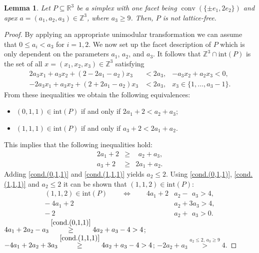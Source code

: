 \documentclass[a4paper]{article}
\theoremstyle{plain}
\newtheorem{lemma}[nn]{Lemma}
\begin{document}
\begin{lemma} \label{simpl.sail}
Let $P \subseteq {\mathbb{R}}^3$ be a simplex with one facet being
${{\mathop{\mathrm{{conv}}}}}(\{\pm e_1, 2e_2\})$ and apex $a = (a_1, a_2, a_3) \in
{\mathbb{Z}}^3$, where $a_3 \geq 9$. Then, $P$ is not lattice-free.
\end{lemma}

\begin{proof}
By applying an appropriate unimodular transformation we can
assume that $0 \leq a_i < a_3$ for $i = 1,2$.
We now set up the facet description of $P$ which is only
dependent on the parameters $a_1$, $a_2$, and $a_3$.
It follows that ${\mathbb{Z}}^3 \cap {\mathrm{int}}(P)$ is the set of all
$x = (x_1, x_2, x_3) \in {\mathbb{Z}}^3$ satisfying
\begin{align*}
   2a_3 x_1 + a_3 x_2 + (2 - 2a_1 - a_2) x_3 & < 2a_3, &
            - a_3 x_2 +              a_2 x_3 < 0, \\
  -2a_3 x_1 + a_3 x_2 + (2 + 2a_1 - a_2) x_3 & < 2a_3, &
  x_3 \in \{1, \ldots, a_3 - 1\}.
\end{align*}
From these inequalities we obtain the following
equivalences:
\begin{itemize} 
  \item $(0,1,1) \in {\mathrm{int}}(P)$ if and only if $2a_1 + 2 < a_2 + a_3$;  
  \item $(1,1,1) \in {\mathrm{int}}(P)$ if and only if $a_3 + 2 < 2a_1 + a_2$. 
\end{itemize}
This implies that the following inequalities hold:
\begin{eqnarray}
  2a_1 + 2 & \geq & \ \, a_2 + a_3, \label{cond.(0,1,1)} \\
   a_3 + 2 & \geq & 2a_1 + a_2. \label{cond.(1,1,1)}
\end{eqnarray}
Adding \eqref{cond.(0,1,1)} and \eqref{cond.(1,1,1)} yields
$a_2 \leq 2$.
Using \eqref{cond.(0,1,1)}, \eqref{cond.(1,1,1)} and $a_2
\leq 2$ it can be shown that $(1,1,2) \in {\mathrm{int}}(P)$:
\begin{align*}
  (1,1,2) \in {\mathrm{int}}(P) \qquad \Longleftrightarrow \qquad
      4a_1 + 2&a_2 - \ \, a_3 > 4, \\
    -~4a_1 + 2&a_2 + 3a_3 > 4, \\
           -~2&a_2 + \ \, a_3 > 0.
\end{align*}
$4a_1 + 2a_2 - a_3 \stackrel{\eqref{cond.(0,1,1)}}{\geq}
4a_2 + a_3 - 4 > 4$;
$-4a_1 + 2a_2 + 3a_3 \stackrel{\eqref{cond.(1,1,1)}}{\geq}
4a_2 + a_3 - 4 > 4$;
$-2a_2 + a_3 \stackrel{a_2 \leq 2,\, a_3 \geq 9}{>} 4$.
\end{proof}
\end{document}
